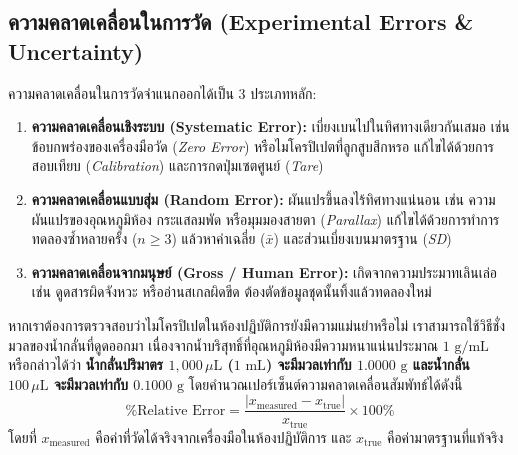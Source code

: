 \subsection{ความคลาดเคลื่อนในการวัด (Experimental Errors \& Uncertainty)}

ความคลาดเคลื่อนในการวัดจำแนกออกได้เป็น 3 ประเภทหลัก:
\begin{enumerate}
    \item \textbf{ความคลาดเคลื่อนเชิงระบบ (Systematic Error):} เบี่ยงเบนไปในทิศทางเดียวกันเสมอ เช่น ข้อบกพร่องของเครื่องมือวัด (\textit{Zero Error}) หรือไมโครปิเปตที่ลูกสูบสึกหรอ แก้ไขได้ด้วยการสอบเทียบ (\textit{Calibration}) และการกดปุ่มเซตศูนย์ (\textit{Tare})
    \item \textbf{ความคลาดเคลื่อนแบบสุ่ม (Random Error):} ผันแปรขึ้นลงไร้ทิศทางแน่นอน เช่น ความผันแปรของอุณหภูมิห้อง กระแสลมพัด หรือมุมมองสายตา (\textit{Parallax}) แก้ไขได้ด้วยการทำการทดลองซ้ำหลายครั้ง ($n \ge 3$) แล้วหาค่าเฉลี่ย ($\bar{x}$) และส่วนเบี่ยงเบนมาตรฐาน (\textit{SD})
    \item \textbf{ความคลาดเคลื่อนจากมนุษย์ (Gross / Human Error):} เกิดจากความประมาทเลินเล่อ เช่น ดูดสารผิดจังหวะ หรืออ่านสเกลผิดขีด ต้องตัดข้อมูลชุดนั้นทิ้งแล้วทดลองใหม่
\end{enumerate}



หากเราต้องการตรวจสอบว่าไมโครปิเปตในห้องปฏิบัติการยังมีความแม่นยำหรือไม่ เราสามารถใช้วิธีชั่งมวลของน้ำกลั่นที่ดูดออกมา เนื่องจากน้ำบริสุทธิ์ที่อุณหภูมิห้องมีความหนาแน่นประมาณ $1\text{ g/mL}$ หรือกล่าวได้ว่า \textbf{น้ำกลั่นปริมาตร $1{,}000\,\mu\text{L}$ ($1\text{ mL}$) จะมีมวลเท่ากับ $1.0000\text{ g}$ และน้ำกลั่น $100\,\mu\text{L}$ จะมีมวลเท่ากับ $0.1000\text{ g}$} โดยคำนวณเปอร์เซ็นต์ความคลาดเคลื่อนสัมพัทธ์ได้ดังนี้
\begin{equation*}
    \% \text{Relative Error} = \frac{|x_{\text{measured}} - x_{\text{true}}|}{x_{\text{true}}} \times 100\%
\end{equation*}
โดยที่ $x_{\text{measured}}$ คือค่าที่วัดได้จริงจากเครื่องมือในห้องปฏิบัติการ และ $x_{\text{true}}$ คือค่ามาตรฐานที่แท้จริง

